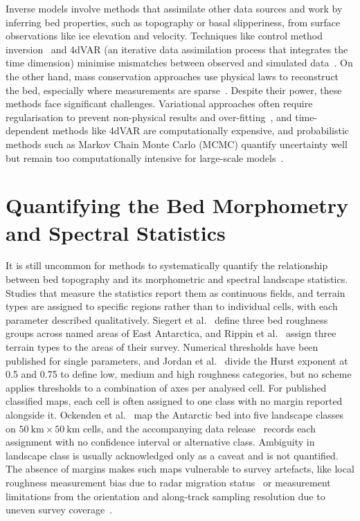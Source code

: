 Inverse models involve methods that assimilate other data sources and work by inferring bed properties, such as topography or basal slipperiness, from surface observations like ice elevation and velocity. Techniques like control method inversion~\cite{DeRydt_2013} and 4dVAR (an iterative  data assimilation process that integrates the time dimension) minimise mismatches between observed and simulated data~\cite{Rabier_2000, Gillet-Chaulet_2020, Morlighem_2023}. On the other hand, mass conservation approaches use physical laws to reconstruct the bed, especially where measurements are sparse~\cite{Morlighem_2017, Morlighem_2020}. Despite their power, these methods face significant challenges. Variational approaches often require regularisation to prevent non-physical results and over-fitting~\cite{Morlighem_2023}, and time-dependent methods like 4dVAR are computationally expensive, and probabilistic methods such as Markov Chain Monte Carlo (MCMC) quantify uncertainty well but remain too computationally intensive for large-scale models~\cite{Morlighem_2023}.

\section{Quantifying the Bed Morphometry and Spectral Statistics}\label{ODSA_intro}

It is still uncommon for methods to systematically quantify the relationship between bed topography and its morphometric and spectral landscape statistics. Studies that measure the statistics report them as continuous fields, and terrain types are assigned to specific regions rather than to individual cells, with each parameter described qualitatively. Siegert et al.~\cite{Siegert_2004} define three bed roughness groups across named areas of East Antarctica, and Rippin et al.~\cite{Rippin_2014} assign three terrain types to the areas of their survey. Numerical thresholds have been published for single parameters, and Jordan et al.~\cite{Jordan_2017} divide the Hurst exponent at 0.5 and 0.75 to define low, medium and high roughness categories, but no scheme applies thresholds to a combination of axes per analysed cell. For published classified maps, each cell is often assigned to one class with no margin reported alongside it. Ockenden et al.~\cite{Ockenden_2026} map the Antarctic bed into five landscape classes on $50~\mathrm{km}\times50~\mathrm{km}$ cells, and the accompanying data release~\cite{Ockenden_2025_data} records each assignment with no confidence interval or alternative class. Ambiguity in landscape class is usually acknowledged only as a caveat and is not quantified. The absence of margins makes such maps vulnerable to survey artefacts, like local roughness measurement bias due to radar migration status~\cite{Taylor_2004, Siegert_2004, Rippin_2011} or measurement limitations from the orientation and along-track sampling resolution due to uneven survey coverage~\cite{Bingham_2009}.

